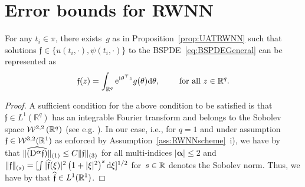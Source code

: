 \section{Error bounds for RWNN}\label{apx:errorRWNN}


\begin{lemma}\label{lem:sol_as_RWNN}
For any $t_i\in\pi$, 
there exists~$g$ as in Proposition~\ref{prop:UATRWNN}
such that solutions $\mathfrak{f}\in\{u(t_i, \cdot), \psi(t_i, \cdot)\}$ to the BSPDE~\eqref{eq:BSPDEGeneral} can be represented as
$$
\mathfrak{f}(z)=\int_{\mathbb{R}^q} \mathrm{e}^{{\mathrm{i}\mkern1mu}\theta^\top z} g(\theta) \mathrm{d} \theta,
\qquad\text{ for all }z\in\mathbb{R}^q.
$$
\end{lemma}
\begin{proof}

A sufficient condition for the above condition to be satisfied is that $\mathfrak{f} \in L^{1}\left(\mathbb{R}^{q}\right)$
has an integrable Fourier transform and belongs to the Sobolev space $\mathcal{W}^{2,2}\left(\mathbb{R}^{q}\right)$ (see e.g. \cite[Theorem~6.1]{Folland1995IntroductionEquations}). 
In our case, i.e., for $q=1$ and under assumption $\mathfrak{f}\in \mathcal{W}^{3,2}(\mathbb{R}^1)$ as enforced by Assumption~\ref{ass:RWNNscheme}~i), we have by~\cite[Theorem~9.17]{Folland2013RealApplications} that $\|\widehat{(\mathrm{D}^{\boldsymbol\alpha} \mathfrak{f})}\|_{(1)} \leq C \|\mathfrak{f}\|_{(3)}$ for all multi-indices $|\boldsymbol\alpha|\leq 2$ and $\|\mathfrak f\|_{(s)}=[\int|\widehat{\mathfrak f}(\xi)|^2\left(1+|\xi|^2\right)^s \mathrm{d} \xi]^{1 / 2}$ for~$s\in\mathbb{R}$ denotes the Sobolev norm. Thus, we have by \cite[Corollary~2.52]{Folland2013RealApplications} that $\widehat{ \mathfrak{f}} \in L^1(\mathbb{R}^1)$.
\end{proof}


